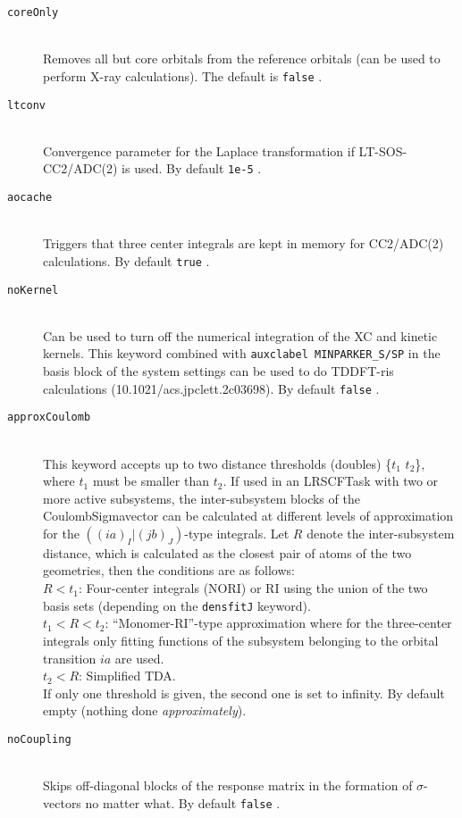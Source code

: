 \documentclass[bibliography=totocnumbered,a4paper,10pt,oneside]{scrbook}
\newcommand{\ttt}[1]{%
  \begingroup\setlength{\fboxsep}{1pt}%
  \colorbox{serenity-green!30}{\texttt{\hspace*{2pt}\vphantom{(g}#1\hspace*{2pt}}}%
  \endgroup
}
\begin{document}
\begin{description}
    \item[\texttt{coreOnly}]\hfill\\
    Removes all but core orbitals from the reference orbitals (can be used to perform X-ray calculations). The default is \ttt{false}.
    \item[\texttt{ltconv}]\hfill \\
	  Convergence parameter for the Laplace transformation if LT-SOS-CC2/ADC(2) is used. By default \ttt{1e-5}.
    \item[\texttt{aocache}]\hfill \\
	  Triggers that three center integrals are kept in memory for CC2/ADC(2) calculations. By default \ttt{true}.
    \item[\texttt{noKernel}]\hfill \\ 
	  Can be used to turn off the numerical integration of the XC and kinetic kernels. This keyword combined with
    \texttt{auxclabel MINPARKER\_S/SP} in the basis block of the system settings can be used to do TDDFT-ris calculations 
    (10.1021/acs.jpclett.2c03698). By default \ttt{false}.
    \item[\texttt{approxCoulomb}]\hfill \\
	  This keyword accepts up to two distance thresholds (doubles) \{$t_1$ $t_2$\}, where $t_1$ must be smaller than $t_2$.
    If used in an LRSCFTask with two or more active subsystems, the inter-subsystem blocks of the CoulombSigmavector
    can be calculated at different levels of approximation for the $((ia)_I|(jb)_J)$-type integrals. Let $R$ denote the
    inter-subsystem distance, which is calculated as the closest pair of atoms of the two geometries, then the conditions are as follows:\\
    $R < t_1$: Four-center integrals (NORI) or RI using the union of the two basis sets (depending on the \texttt{densfitJ} keyword).\\
    $t_1 < R < t_2$: ``Monomer-RI''-type approximation where for the three-center integrals only fitting functions of the subsystem belonging to the orbital transition $ia$ are used. \\
    $t_2 < R$: Simplified TDA. \\
    If only one threshold is given, the second one is set to infinity. By default empty (nothing done \emph{approximately}).
    \item[\texttt{noCoupling}]\hfill \\
	  Skips off-diagonal blocks of the response matrix in the formation of $\sigma$-vectors no matter what. By default \ttt{false}.
\end{description}
\end{document}

